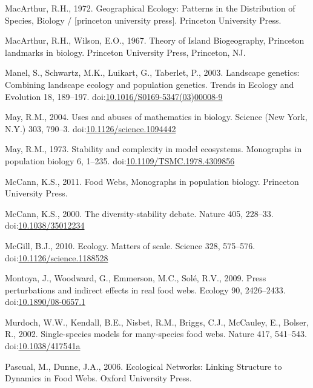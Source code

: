 \hypertarget{ref-macarthur1972geographical}{}
MacArthur, R.H., 1972. Geographical Ecology: Patterns in the
Distribution of Species, Biology / {[}princeton university press{]}.
Princeton University Press.

\hypertarget{ref-MacArthur1967}{}
MacArthur, R.H., Wilson, E.O., 1967. Theory of Island Biogeography,
Princeton landmarks in biology. Princeton University Press, Princeton,
NJ.

\hypertarget{ref-Manel2003}{}
Manel, S., Schwartz, M.K., Luikart, G., Taberlet, P., 2003. Landscape
genetics: Combining landscape ecology and population genetics. Trends in
Ecology and Evolution 18, 189--197.
doi:\href{https://doi.org/10.1016/S0169-5347(03)00008-9}{10.1016/S0169-5347(03)00008-9}

\hypertarget{ref-May2004}{}
May, R.M., 2004. Uses and abuses of mathematics in biology. Science (New
York, N.Y.) 303, 790--3.
doi:\href{https://doi.org/10.1126/science.1094442}{10.1126/science.1094442}

\hypertarget{ref-May1973}{}
May, R.M., 1973. Stability and complexity in model ecosystems.
Monographs in population biology 6, 1--235.
doi:\href{https://doi.org/10.1109/TSMC.1978.4309856}{10.1109/TSMC.1978.4309856}

\hypertarget{ref-mccann2011food}{}
McCann, K.S., 2011. Food Webs, Monographs in population biology.
Princeton University Press.

\hypertarget{ref-McCann2000}{}
McCann, K.S., 2000. The diversity-stability debate. Nature 405, 228--33.
doi:\href{https://doi.org/10.1038/35012234}{10.1038/35012234}

\hypertarget{ref-McGill2010}{}
McGill, B.J., 2010. Ecology. Matters of scale. Science 328, 575--576.
doi:\href{https://doi.org/10.1126/science.1188528}{10.1126/science.1188528}

\hypertarget{ref-Montoya2009}{}
Montoya, J., Woodward, G., Emmerson, M.C., Solé, R.V., 2009. Press
perturbations and indirect effects in real food webs. Ecology 90,
2426--2433.
doi:\href{https://doi.org/10.1890/08-0657.1}{10.1890/08-0657.1}

\hypertarget{ref-Murdoch2002}{}
Murdoch, W.W., Kendall, B.E., Nisbet, R.M., Briggs, C.J., McCauley, E.,
Bolser, R., 2002. Single-species models for many-species food webs.
Nature 417, 541--543.
doi:\href{https://doi.org/10.1038/417541a}{10.1038/417541a}

\hypertarget{ref-Pascual2006}{}
Pascual, M., Dunne, J.A., 2006. Ecological Networks: Linking Structure
to Dynamics in Food Webs. Oxford University Press.

